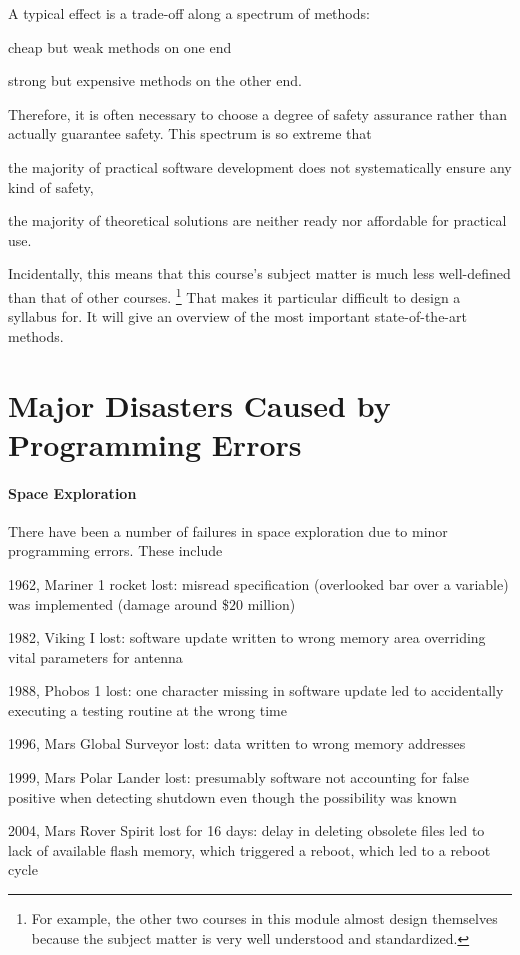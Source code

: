 A typical effect is a trade-off along a spectrum of methods:
\begin{compactitem}
 \item cheap but weak methods on one end
 \item strong but expensive methods on the other end.
\end{compactitem}
Therefore, it is often necessary to choose a degree of safety assurance rather than actually guarantee safety.
This spectrum is so extreme that
\begin{compactitem}
 \item the majority of practical software development does not systematically ensure any kind of safety,
 \item the majority of theoretical solutions are neither ready nor affordable for practical use.
\end{compactitem}

Incidentally, this means that this course's subject matter is much less well-defined than that of other courses.%
\footnote{For example, the other two courses in this module almost design themselves because the subject matter is very well understood and standardized.}
That makes it particular difficult to design a syllabus for.
It will give an overview of the most important state-of-the-art methods.

\section{Major Disasters Caused by Programming Errors}

\paragraph{Space Exploration}
There have been a number of failures in space exploration due to minor programming errors.
These include
\begin{compactitem}
 \item 1962, Mariner 1 rocket lost: misread specification (overlooked bar over a variable) was implemented (damage around \$$20$ million)
 \item 1982, Viking I lost: software update written to wrong memory area overriding vital parameters for antenna
 \item 1988, Phobos 1 lost: one character missing in software update led to accidentally executing a testing routine at the wrong time
 \item 1996, Mars Global Surveyor lost: data written to wrong memory addresses
 \item 1999, Mars Polar Lander lost: presumably software not accounting for false positive when detecting shutdown even though the possibility was known
 \item 2004, Mars Rover Spirit lost for 16 days: delay in deleting obsolete files led to lack of available flash memory, which triggered a reboot, which led to a reboot cycle
\end{compactitem}

